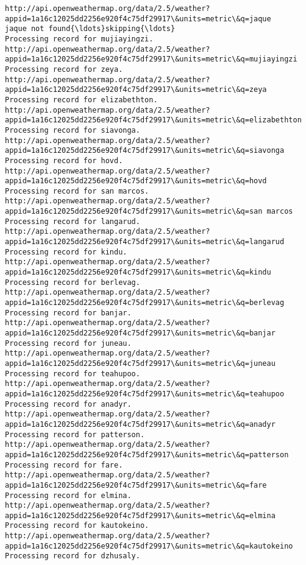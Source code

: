 \documentclass[11pt]{article}
\begin{document}
\begin{Verbatim}[commandchars=\\\{\}]
http://api.openweathermap.org/data/2.5/weather?appid=1a16c12025dd2256e920f4c75df29917\&units=metric\&q=jaque
jaque not found{\ldots}skipping{\ldots}
Processing record for mujiayingzi.
http://api.openweathermap.org/data/2.5/weather?appid=1a16c12025dd2256e920f4c75df29917\&units=metric\&q=mujiayingzi
Processing record for zeya.
http://api.openweathermap.org/data/2.5/weather?appid=1a16c12025dd2256e920f4c75df29917\&units=metric\&q=zeya
Processing record for elizabethton.
http://api.openweathermap.org/data/2.5/weather?appid=1a16c12025dd2256e920f4c75df29917\&units=metric\&q=elizabethton
Processing record for siavonga.
http://api.openweathermap.org/data/2.5/weather?appid=1a16c12025dd2256e920f4c75df29917\&units=metric\&q=siavonga
Processing record for hovd.
http://api.openweathermap.org/data/2.5/weather?appid=1a16c12025dd2256e920f4c75df29917\&units=metric\&q=hovd
Processing record for san marcos.
http://api.openweathermap.org/data/2.5/weather?appid=1a16c12025dd2256e920f4c75df29917\&units=metric\&q=san marcos
Processing record for langarud.
http://api.openweathermap.org/data/2.5/weather?appid=1a16c12025dd2256e920f4c75df29917\&units=metric\&q=langarud
Processing record for kindu.
http://api.openweathermap.org/data/2.5/weather?appid=1a16c12025dd2256e920f4c75df29917\&units=metric\&q=kindu
Processing record for berlevag.
http://api.openweathermap.org/data/2.5/weather?appid=1a16c12025dd2256e920f4c75df29917\&units=metric\&q=berlevag
Processing record for banjar.
http://api.openweathermap.org/data/2.5/weather?appid=1a16c12025dd2256e920f4c75df29917\&units=metric\&q=banjar
Processing record for juneau.
http://api.openweathermap.org/data/2.5/weather?appid=1a16c12025dd2256e920f4c75df29917\&units=metric\&q=juneau
Processing record for teahupoo.
http://api.openweathermap.org/data/2.5/weather?appid=1a16c12025dd2256e920f4c75df29917\&units=metric\&q=teahupoo
Processing record for anadyr.
http://api.openweathermap.org/data/2.5/weather?appid=1a16c12025dd2256e920f4c75df29917\&units=metric\&q=anadyr
Processing record for patterson.
http://api.openweathermap.org/data/2.5/weather?appid=1a16c12025dd2256e920f4c75df29917\&units=metric\&q=patterson
Processing record for fare.
http://api.openweathermap.org/data/2.5/weather?appid=1a16c12025dd2256e920f4c75df29917\&units=metric\&q=fare
Processing record for elmina.
http://api.openweathermap.org/data/2.5/weather?appid=1a16c12025dd2256e920f4c75df29917\&units=metric\&q=elmina
Processing record for kautokeino.
http://api.openweathermap.org/data/2.5/weather?appid=1a16c12025dd2256e920f4c75df29917\&units=metric\&q=kautokeino
Processing record for dzhusaly.

\end{Verbatim}
\end{document}
